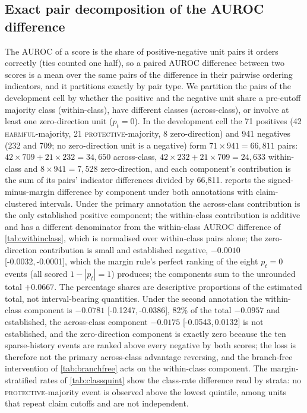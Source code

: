 \documentclass[11pt]{article}
\newcommand{\ci}[2]{[#1,\,#2]}
\begin{document}
\subsection{Exact pair decomposition of the AUROC difference}
\label{app:decomp}
The AUROC of a score is the share of positive-negative unit pairs it orders correctly (ties counted
one half), so a paired AUROC difference between two scores is a mean over the same pairs of the
difference in their pairwise ordering indicators, and it partitions exactly by pair type. We
partition the pairs of the development cell by whether the positive and the negative unit share a
pre-cutoff majority class (within-class), have different classes (across-class), or involve at
least one zero-direction unit ($p_t=0$). In the development cell the 71 positives (42
\textsc{harmful}-majority, 21 \textsc{protective}-majority, 8 zero-direction) and 941 negatives
(232 and 709; no zero-direction unit is a negative) form $71\times941=66{,}811$ pairs:
$42\times709+21\times232=34{,}650$ across-class, $42\times232+21\times709=24{,}633$ within-class and
$8\times941=7{,}528$ zero-direction, and each component's contribution is the sum of its pairs'
indicator differences divided by 66{,}811.  reports the signed-minus-margin
difference by component under both annotations with claim-clustered intervals. Under the primary
annotation the across-class contribution is the only established positive component; the
within-class contribution is additive and has a different denominator from the within-class AUROC
difference of \cref{tab:withinclass}, which is normalised over within-class pairs alone; the
zero-direction contribution is small and established negative, $-0.0010$ \ci{-0.0032}{-0.0001},
which the margin rule's perfect ranking of the eight $p_t=0$ events (all scored $1-|p_t|=1$)
produces; the components sum to the unrounded total $+0.0667$. The percentage shares are
descriptive proportions of the estimated total, not interval-bearing quantities. Under the second
annotation the within-class component is $-0.0781$ \ci{-0.1247}{-0.0386}, 82\% of the total
$-0.0957$ and established, the across-class component $-0.0175$ \ci{-0.0543}{0.0132} is not
established, and the zero-direction component is exactly zero because the ten sparse-history
events are ranked above every negative by both scores; the loss is therefore not the primary
across-class advantage reversing, and the branch-free intervention of \cref{tab:branchfree} acts
on the within-class component. The margin-stratified rates of \cref{tab:classquint} show the
class-rate difference read by strata: no \textsc{protective}-majority event is observed above the
lowest quintile, among units that repeat claim cutoffs and are not independent.
\end{document}
